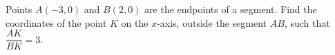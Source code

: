 Points $A(-3,0)$ and $B(2,0)$ are the endpoints of a segment. Find the coordinates of the point $K$ on the $x$-axis, outside the segment $AB$, such that $\dfrac{AK}{BK}=3$.
